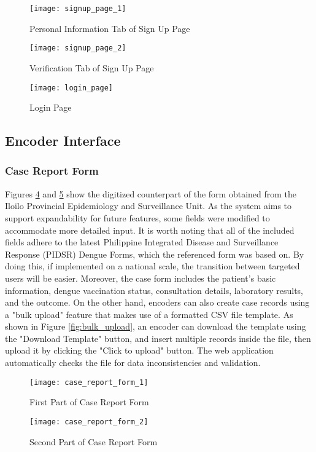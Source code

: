\begin{figure}[H]
	\centering
	\texttt{[image: signup\_page\_1]}
	\caption{Personal Information Tab of Sign Up Page}
	\label{fig:signup_page_1}
\end{figure}
\begin{figure}[H]
	\centering
	\texttt{[image: signup\_page\_2]}
	\caption{Verification Tab of Sign Up Page}
	\label{fig:signup_page_2}
\end{figure}

\begin{figure}[H]
	\centering
	\texttt{[image: login\_page]}
	\caption{Login Page}
	\label{fig:login_page}
\end{figure}

\subsection{Encoder Interface}
\subsubsection{Case Report Form}
Figures \ref{fig:case_report_form_1} and \ref{fig:case_report_form_2} show the digitized counterpart of the form obtained from the Iloilo Provincial Epidemiology and Surveillance Unit. As the system aims to support expandability for future features, some fields were modified to accommodate more detailed input. It is worth noting that all of the included fields adhere to the latest Philippine Integrated Disease and Surveillance Response (PIDSR) Dengue Forms, which the referenced form was based on. By doing this, if implemented on a national scale, the transition between targeted users will be easier. Moreover, the case form includes the patient's basic information, dengue vaccination status, consultation details, laboratory results, and the outcome. On the other hand, encoders can also create case records using a "bulk upload" feature that makes use of a formatted CSV file template. As shown in Figure \ref{fig:bulk_upload}, an encoder can download the template using the "Download Template" button, and insert multiple records inside the file, then upload it by clicking the "Click to upload" button. The web application automatically checks the file for data inconsistencies and validation. 

\begin{figure}[H]
	\centering
	\texttt{[image: case\_report\_form\_1]}
	\caption{First Part of Case Report Form}
	\label{fig:case_report_form_1}
\end{figure}
\begin{figure}[H]
	\centering
	\texttt{[image: case\_report\_form\_2]}
	\caption{Second Part of Case Report Form}
	\label{fig:case_report_form_2}
\end{figure}

